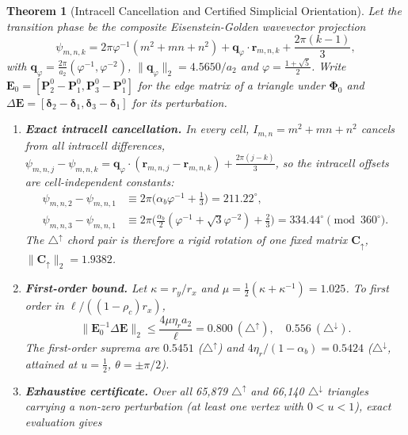 \documentclass[11pt,a4paper]{article}
\newtheorem{theorem}{Theorem}[section]
\theoremstyle{definition}
\theoremstyle{remark}
\begin{document}
\begin{theorem}[Intracell Cancellation and Certified Simplicial Orientation]\label{thm:jac}
Let the transition phase be the composite \emph{Eisenstein-Golden wavevector projection}
\begin{equation}
\psi_{m,n,k} = 2\pi\varphi^{-1}\left(m^2 + mn + n^2\right) + \mathbf{q}_\varphi \cdot \mathbf{r}_{m,n,k} + \frac{2\pi(k-1)}{3},
\end{equation}
with $\mathbf{q}_\varphi = \frac{2\pi}{a_2}\left(\varphi^{-1}, \varphi^{-2}\right)$, $\|\mathbf{q}_\varphi\|_2 = 4.5650/a_2$ and $\varphi = \frac{1+\sqrt{5}}{2}$. Write $\mathbf{E}_0 = [\mathbf{P}_2^0-\mathbf{P}_1^0, \mathbf{P}_3^0-\mathbf{P}_1^0]$ for the edge matrix of a triangle under $\mathbf{\Phi}_0$ and $\Delta\mathbf{E} = [\bm{\delta}_2-\bm{\delta}_1, \bm{\delta}_3-\bm{\delta}_1]$ for its perturbation.
\begin{enumerate}[noitemsep]
    \item \textbf{Exact intracell cancellation.} In every cell, $I_{m,n} = m^2+mn+n^2$ cancels from all intracell differences, $\psi_{m,n,j} - \psi_{m,n,k} = \mathbf{q}_\varphi \cdot (\mathbf{r}_{m,n,j} - \mathbf{r}_{m,n,k}) + \frac{2\pi(j-k)}{3}$, so the intracell offsets are cell-independent constants:
    \begin{align}
    \psi_{m,n,2}-\psi_{m,n,1} &\equiv 2\pi\bigl(\alpha_b\varphi^{-1} + \tfrac13\bigr) = 211.22^\circ,\\
    \psi_{m,n,3}-\psi_{m,n,1} &\equiv 2\pi\bigl(\tfrac{\alpha_b}{2}(\varphi^{-1}+\sqrt3\varphi^{-2}) + \tfrac23\bigr) = 334.44^\circ \pmod{360^\circ}.
    \end{align}
    The $\triangle^{\uparrow}$ chord pair is therefore a rigid rotation of one fixed matrix $\mathbf{C}_{\uparrow}$, $\|\mathbf{C}_{\uparrow}\|_2 = 1.9382$.
    \item \textbf{First-order bound.} Let $\kappa = r_y/r_x$ and $\mu = \tfrac12(\kappa+\kappa^{-1}) = 1.025$. To first order in $\ell/((1-\rho_c)r_x)$,
    \begin{equation}
    \|\mathbf{E}_0^{-1}\Delta\mathbf{E}\|_2 \le \frac{4\mu\eta_r a_2}{\ell} = 0.800\ (\triangle^{\uparrow}),\quad 0.556\ (\triangle^{\downarrow}).
    \end{equation}
    The first-order suprema are $0.5451$ ($\triangle^{\uparrow}$) and $4\eta_r/(1-\alpha_b) = 0.5424$ ($\triangle^{\downarrow}$, attained at $u=\tfrac12$, $\theta = \pm\pi/2$).
    \item \textbf{Exhaustive certificate.} Over all 65{,}879 $\triangle^{\uparrow}$ and 66{,}140 $\triangle^{\downarrow}$ triangles carrying a non-zero perturbation (at least one vertex with $0<u<1$), exact evaluation gives

\end{enumerate}
\end{theorem}
\end{document}
